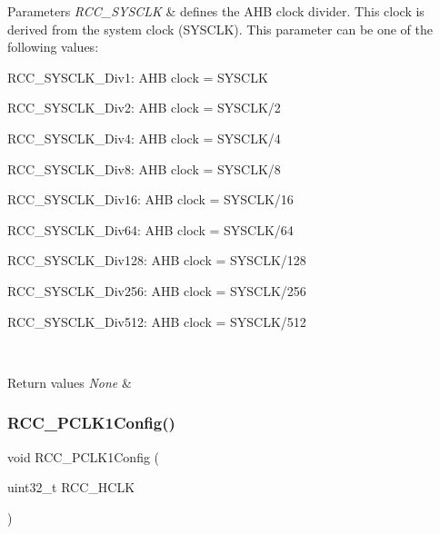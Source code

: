 \begin{DoxyParams}{Parameters}
{\em R\+C\+C\+\_\+\+S\+Y\+S\+C\+LK} & defines the A\+HB clock divider. This clock is derived from the system clock (S\+Y\+S\+C\+LK). This parameter can be one of the following values\+: \begin{DoxyItemize}
\item R\+C\+C\+\_\+\+S\+Y\+S\+C\+L\+K\+\_\+\+Div1\+: A\+HB clock = S\+Y\+S\+C\+LK \item R\+C\+C\+\_\+\+S\+Y\+S\+C\+L\+K\+\_\+\+Div2\+: A\+HB clock = S\+Y\+S\+C\+L\+K/2 \item R\+C\+C\+\_\+\+S\+Y\+S\+C\+L\+K\+\_\+\+Div4\+: A\+HB clock = S\+Y\+S\+C\+L\+K/4 \item R\+C\+C\+\_\+\+S\+Y\+S\+C\+L\+K\+\_\+\+Div8\+: A\+HB clock = S\+Y\+S\+C\+L\+K/8 \item R\+C\+C\+\_\+\+S\+Y\+S\+C\+L\+K\+\_\+\+Div16\+: A\+HB clock = S\+Y\+S\+C\+L\+K/16 \item R\+C\+C\+\_\+\+S\+Y\+S\+C\+L\+K\+\_\+\+Div64\+: A\+HB clock = S\+Y\+S\+C\+L\+K/64 \item R\+C\+C\+\_\+\+S\+Y\+S\+C\+L\+K\+\_\+\+Div128\+: A\+HB clock = S\+Y\+S\+C\+L\+K/128 \item R\+C\+C\+\_\+\+S\+Y\+S\+C\+L\+K\+\_\+\+Div256\+: A\+HB clock = S\+Y\+S\+C\+L\+K/256 \item R\+C\+C\+\_\+\+S\+Y\+S\+C\+L\+K\+\_\+\+Div512\+: A\+HB clock = S\+Y\+S\+C\+L\+K/512 \end{DoxyItemize}
\\
\hline
\end{DoxyParams}

\begin{DoxyRetVals}{Return values}
{\em None} & \\
\hline
\end{DoxyRetVals}
\mbox{\label{group___r_c_c___group2_ga448137346d4292985d4e7a61dd1a824f}} 
\subsubsection{\texorpdfstring{R\+C\+C\+\_\+\+P\+C\+L\+K1\+Config()}{RCC\_PCLK1Config()}}
{\footnotesize\ttfamily void R\+C\+C\+\_\+\+P\+C\+L\+K1\+Config (\begin{DoxyParamCaption}\item[{uint32\+\_\+t}]{R\+C\+C\+\_\+\+H\+C\+LK }\end{DoxyParamCaption})}



